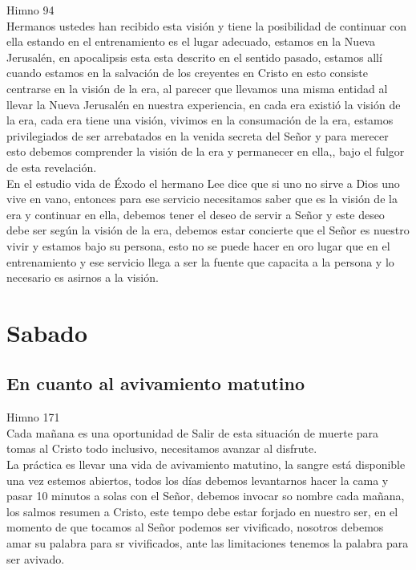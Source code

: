 \documentclass[12pt]{article}
\begin{document}
Himno 94\\

Hermanos ustedes han recibido esta visión y tiene la posibilidad de continuar con ella estando en el entrenamiento es el lugar adecuado, estamos en la Nueva Jerusalén, en apocalipsis esta esta descrito en el sentido pasado, estamos allí cuando estamos en la salvación de los creyentes en Cristo en esto consiste centrarse en la visión de la era, al parecer que llevamos una misma entidad al llevar la Nueva Jerusalén en nuestra experiencia, en cada era existió la visión de la era, cada era tiene una visión, vivimos en la consumación de la era, estamos privilegiados de ser arrebatados en la venida secreta del Señor y para merecer esto debemos comprender la visión de la era y permanecer en ella,, bajo el fulgor de esta revelación.\\

En el estudio vida de Éxodo el hermano Lee dice que si uno no sirve a Dios uno vive en vano, entonces para ese servicio necesitamos saber que es la visión de la era y continuar en ella, debemos tener el deseo de servir a Señor y este deseo debe ser según la visión de la era, debemos estar concierte que el Señor es nuestro vivir y estamos bajo su persona, esto no se puede hacer en oro lugar que en el entrenamiento y ese servicio llega a ser la fuente que capacita a la persona y lo necesario es asirnos a la visión.\\

\section*{Sabado}

\subsection*{En cuanto al avivamiento matutino}

Himno 171\\

Cada mañana es una oportunidad de Salir de esta situación de muerte para tomas al Cristo todo inclusivo, necesitamos avanzar al disfrute.\\

La práctica es llevar una vida de avivamiento matutino, la sangre está disponible una vez estemos abiertos, todos los días debemos levantarnos hacer la cama y pasar 10 minutos a solas con el Señor, debemos invocar so nombre cada mañana, los salmos resumen a Cristo, este tempo debe estar forjado en nuestro ser, en el momento de que tocamos al Señor podemos ser vivificado, nosotros debemos amar su palabra para sr vivificados, ante las limitaciones tenemos la palabra para ser avivado.\\
\end{document}
